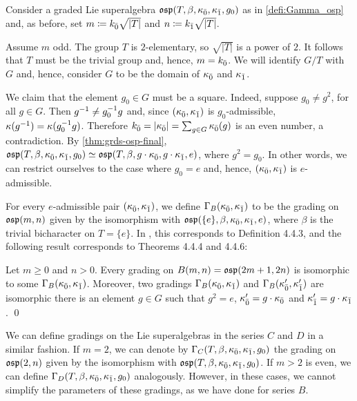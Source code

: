 Consider a graded Lie superalgebra $\mathfrak{osp}(T, \beta, \kappa_{\bar{0}}, \kappa_{\bar{1}}, g_0)$ as in \cref{defi:Gamma_osp} and, as before, set $m \coloneqq k_{\bar{0}} \sqrt{|T|}$ and $n \coloneqq k_{\bar{1}} \sqrt{|T|}$. 

Assume $m$ odd. 
The group $T$ is  $2$-elementary, so $\sqrt{|T|}$ is a power of $2$. 
It follows that $T$ must be the trivial group and, hence, $ m = k_{\bar{0}}$. 
We will identify $G/T$ with $G$ and, hence, consider $G$ to be the domain of $\kappa_{\bar{0}}$ and $\kappa_{\bar{1}}$. 

We claim that the element $g_0 \in G$ must be a square. 
Indeed, suppose $g_0 \neq g^2$, for all $g\in G$. 
Then $g^{-1} \neq g_0^{-1} g$ and, since $(\kappa_{\bar{0}}, \kappa_{\bar{1}})$ is $g_0$-admissible, $\kappa(g^{-1}) = \kappa(g_0^{-1} g)$. 
Therefore $k_{\bar{0}} = |\kappa_{\bar{0}}| = \sum_{g \in G} \kappa_{\bar{0}}(g)$ is an even number, a contradiction. 
By \cref{thm:grds-osp-final}, $\mathfrak{osp}(T, \beta, \kappa_{\bar{0}}, \kappa_{\bar{1}}, g_0) \simeq \mathfrak{osp}(T, \beta, g\cdot \kappa_{\bar{0}}, g\cdot \kappa_{\bar{1}}, e)$, where $g^2 = g_0$. 
In other words, we can restrict ourselves to the case where $g_0 = e$ and, hence, $(\kappa_{\bar{0}}, \kappa_{\bar{1}})$ is $e$-admissible.

For every $e$-admissible pair $(\kappa_{\bar{0}}, \kappa_{\bar{1}})$, we define $\Gamma_B(\kappa_{\bar{0}}, \kappa_{\bar{1}})$ to be the grading on $\mathfrak{osp}(m,n)$ given by the isomorphism with $\mathfrak{osp}(\{e\}, \beta, \kappa_{\bar{0}}, \kappa_{\bar{1}}, e)$, where $\beta$ is the trivial bicharacter on $T = \{e\}$. 
In \cite{Helens_thesis}, this corresponds to Definition 4.4.3, and the following result corresponds to Theorems 4.4.4 and 4.4.6: 

\begin{cor}
    Let $m\geq 0$ and $n > 0$. 
    Every grading on $B(m,n) = \mathfrak{osp}(2m+1, 2n)$ is isomorphic to some $\Gamma_B (\kappa_{\bar{0}}, \kappa_{\bar{1}})$. 
    Moreover, two gradings $\Gamma_B (\kappa_{\bar{0}}, \kappa_{\bar{1}})$ and $\Gamma_B (\kappa_{\bar{0}}', \kappa_{\bar{1}}')$ are isomorphic \IFF there is an element $g \in G$ such that $g^2 = e$, $\kappa_{\bar{0}}' = g\cdot \kappa_{\bar{0}}$ and $\kappa_{\bar{1}}' = g\cdot \kappa_{\bar{1}}$. \qed
\end{cor}

We can define gradings on the Lie superalgebras in the series $C$ and $D$ in a similar fashion. 
If $m = 2$, we can denote by $\Gamma_C (T, \beta, \kappa_{\bar{0}}, \kappa_{\bar{1}}, g_0)$ the grading on $\mathfrak{osp} (2,n)$ given by the isomorphism with $\mathfrak{osp}(T, \beta, \kappa_{\bar{0}}, \kappa_{\bar{1}}, g_0)$. 
If $m > 2$ is even, we can define $\Gamma_D (T, \beta, \kappa_{\bar{0}}, \kappa_{\bar{1}}, g_0)$ analogously. 
However, in these cases, we cannot simplify the parameters of these gradings, as we have done for series $B$. 
